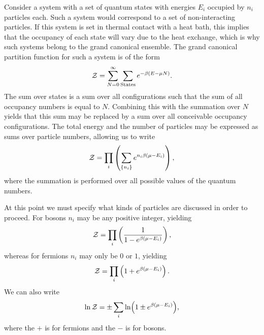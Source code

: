 Consider a system with a set of quantum states with energies $E_{i}$ occupied by $n_{i}$ particles each. Such a system would correspond to a set of non-interacting particles. If this system is set in thermal contact with a heat bath, this implies that the occupancy of each state will vary due to the heat exchange, which is why such systems belong to the grand canonical ensemble. The grand canonical partition function for such a system is of the form
\begin{align*}
	\mathcal{Z} = \sum\limits_{N = 0}^{\infty}\sum\limits_{\text{States}}e^{-\beta(E - \mu N)}.
\end{align*}
The sum over states is a sum over all configurations such that the sum of all occupancy numbers is equal to $N$. Combining this with the summation over $N$ yields that this sum may be replaced by a sum over all conceivable occupancy configurations. The total energy and the number of particles may be expressed as sums over particle numbers, allowing us to write
\begin{align*}
	\mathcal{Z} = \prod\limits_{i}\left(\sum\limits_{\{n_{i}\}}e^{n_{i}\beta(\mu - E_{i})}\right),
\end{align*}
where the summation is performed over all possible values of the quantum numbers.

At this point we must specify what kinds of particles are discussed in order to proceed. For bosons $n_{i}$ may be any positive integer, yielding
\begin{align*}
	\mathcal{Z} = \prod\limits_{i}\left(\frac{1}{1 - e^{\beta(\mu - E_{i})}}\right),
\end{align*}
whereas for fermions $n_{i}$ may only be $0$ or $1$, yielding
\begin{align*}
	\mathcal{Z} = \prod\limits_{i}\left(1 + e^{\beta(\mu - E_{i})}\right).
\end{align*}
We can also write
\begin{align*}
	\ln{\mathcal{Z}} = \pm\sum\limits_{i}\ln(1 \pm e^{\beta(\mu - E_{i})}),
\end{align*}
where the $+$ is for fermions and the $-$ is for bosons.

